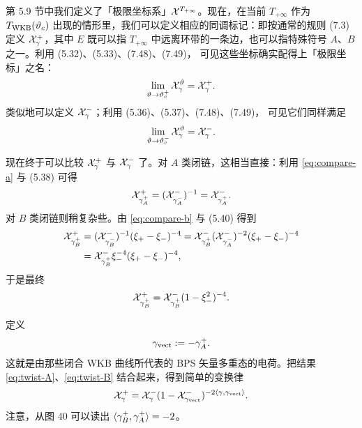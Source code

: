 第 5.9 节中我们定义了「极限坐标系」$\mathcal{X}^{T_{+\infty}}$。现在，在当前 $T_{+\infty}$ 作为 $T_{\rm WKB}(\vartheta_c)$ 出现的情形里，我们可以定义相应的同调标记：即按通常的规则 (7.3)%
定义 $\mathcal{X}^+_\gamma$，其中 $E$ 既可以指 $T_{+\infty}$ 中远离环带的一条边，也可以指特殊符号 $A$、$B$ 之一。利用 (5.32)、(5.33)、(7.48)、(7.49)，%
可见这些坐标确实配得上「极限坐标」之名：
\begin{equation}
\lim_{\vartheta\to\vartheta_c^+} \mathcal{X}^{\vartheta}_\gamma = \mathcal{X}^+_\gamma. \label{eq:limit-1}
\end{equation}
类似地可以定义 $\mathcal{X}^-_\gamma$；利用 (5.36)、(5.37)、(7.48)、(7.49)，%
可见它们同样满足
\begin{equation}
\lim_{\vartheta\to\vartheta_c^-} \mathcal{X}^{\vartheta}_\gamma = \mathcal{X}^-_\gamma. \label{eq:limit-2}
\end{equation}

现在终于可以比较 $\mathcal{X}^+_\gamma$ 与 $\mathcal{X}^-_\gamma$ 了。对 $A$ 类闭链，这相当直接：利用 \eqref{eq:compare-a} 与 (5.38)%
可得
\begin{equation} \label{eq:twist-A}
\mathcal{X}^+_{\gamma^+_A} = (\mathcal{X}^-_{\gamma^-_A})^{-1} = \mathcal{X}^-_{\gamma^+_A}.
\end{equation}
对 $B$ 类闭链则稍复杂些。由 \eqref{eq:compare-b} 与 (5.40)%
得到
\begin{equation}
\begin{split}
\mathcal{X}^+_{\gamma^+_B} &= (\mathcal{X}^-_{\gamma^-_B})^{-1} (\xi_+ - \xi_-)^{-4}
= \mathcal{X}^-_{\gamma^+_B} (\mathcal{X}^-_{\gamma^-_A})^{-2} (\xi_+ - \xi_-)^{-4} \\
&= \mathcal{X}^-_{\gamma^+_B} \xi_-^{-4} (\xi_+ - \xi_-)^{-4},
\end{split}
\end{equation}
于是最终
\begin{equation} \label{eq:twist-B}
\mathcal{X}^+_{\gamma^+_B} = \mathcal{X}^-_{\gamma^+_B} (1 - \xi_-^2)^{-4}.
\end{equation}

定义
\begin{equation}
\gamma_{\rm vect} := - \gamma^+_A.
\end{equation}
这就是由那些闭合 WKB 曲线所代表的 BPS 矢量多重态的电荷。把结果 \eqref{eq:twist-A}、\eqref{eq:twist-B} 结合起来，得到简单的变换律
\begin{equation} \label{eq:twist-KS}
\mathcal{X}^+_\gamma = \mathcal{X}^-_\gamma (1 - \mathcal{X}^-_{\gamma_{\rm vect}})^{-2 \langle \gamma, \gamma_{\rm vect} \rangle}.
\end{equation}
注意，从图 40 可以读出 $\langle \gamma_B^+, \gamma_A^+ \rangle=-2$。%

